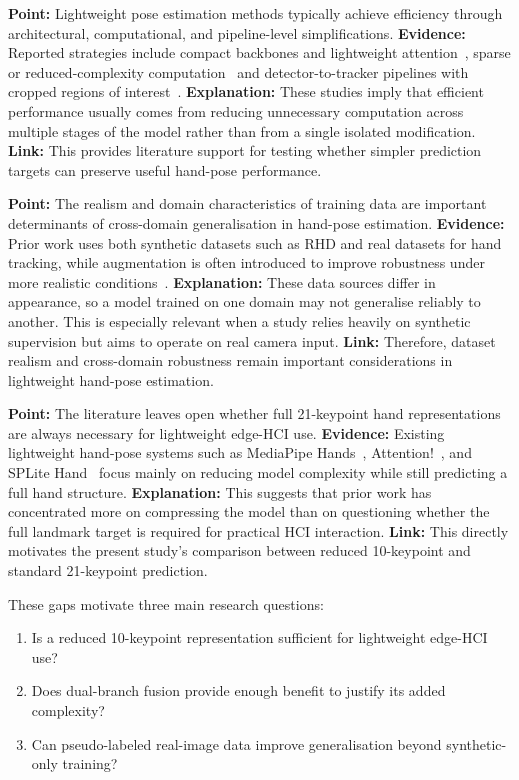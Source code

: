 \documentclass[10pt,letterpaper]{article}
\begin{document}
\medskip
\noindent\textbf{Point:} Lightweight pose estimation methods typically achieve efficiency through architectural, computational, and pipeline-level simplifications.  
\textbf{Evidence:} Reported strategies include compact backbones and lightweight attention~\cite{attentionlite}, sparse or reduced-complexity computation~\cite{splitehand} and detector-to-tracker pipelines with cropped regions of interest~\cite{mediapipe}.  
\textbf{Explanation:} These studies imply that efficient performance usually comes from reducing unnecessary computation across multiple stages of the model rather than from a single isolated modification.  
\textbf{Link:} This provides literature support for testing whether simpler prediction targets can preserve useful hand-pose performance.

\medskip
\noindent\textbf{Point:} The realism and domain characteristics of training data are important determinants of cross-domain generalisation in hand-pose estimation. 
\textbf{Evidence:} Prior work uses both synthetic datasets such as RHD and real datasets for hand tracking, while augmentation is often introduced to improve robustness under more realistic conditions~\cite{handobjectgcn,lightweightgcnhand,handaugment}.  
\textbf{Explanation:} These data sources differ in appearance, so a model trained on one domain may not generalise reliably to another. This is especially relevant when a study relies heavily on synthetic supervision but aims to operate on real camera input.  
\textbf{Link:} Therefore, dataset realism and cross-domain robustness remain important considerations in lightweight hand-pose estimation.

\medskip
\noindent\textbf{Point:} The literature leaves open whether full 21-keypoint hand representations are always necessary for lightweight edge-HCI use.  
\textbf{Evidence:} Existing lightweight hand-pose systems such as MediaPipe Hands~\cite{mediapipe}, Attention!~\cite{attentionlite}, and SPLite Hand~\cite{splitehand} focus mainly on reducing model complexity while still predicting a full hand structure.  
\textbf{Explanation:} This suggests that prior work has concentrated more on compressing the model than on questioning whether the full landmark target is required for practical HCI interaction.  
\textbf{Link:} This directly motivates the present study's comparison between reduced 10-keypoint and standard 21-keypoint prediction.

\medskip
These gaps motivate three main research questions:
\begin{enumerate}
    \item Is a reduced 10-keypoint representation sufficient for lightweight edge-HCI use?
    \item Does dual-branch fusion provide enough benefit to justify its added complexity?
    \item Can pseudo-labeled real-image data improve generalisation beyond synthetic-only training?
\end{enumerate}
\end{document}
